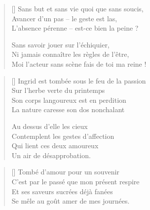 \settowidth{\versewidth}{Moi l'acteur sans scène fais de toi ma reine !}
\begin{verse}[\versewidth]
Sans but et sans vie quoi que sans soucis, \\
Avancer d'un pas -- le geste est las, \\
L'absence pérenne -- est-ce bien la peine ?

Sans savoir jouer sur l'échiquier, \\
Ni jamais connaître les règles de l'être, \\
Moi l'acteur sans scène fais de toi ma reine !
\end{verse}


\settowidth{\versewidth}{Ingrid est tombée sous le feu de la passion}
\begin{verse}[\versewidth]
Ingrid est tombée sous le feu de la passion \\
Sur l'herbe verte du printemps \\
Son corps langoureux est en perdition \\
La nature caresse son dos nonchalant

Au dessus d'elle les cieux \\
Contemplent les gestes d'affection \\
Qui lient ces deux amoureux \\
Un air de désapprobation.
\end{verse}


\settowidth{\versewidth}{C'est par le passé que mon présent respire}
\begin{verse}[\versewidth]
Tombé d'amour pour un souvenir \\
C'est par le passé que mon présent respire \\
Et ses saveurs sucrées déjà fanées \\
Se mêle au goût amer de mes journées.
\end{verse}